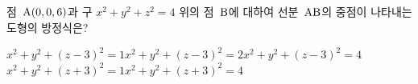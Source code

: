 점~$\mathrm{A}(0{,}\mkern3mu\mathopen{}0{,}\mkern3mu\mathopen{}6)$과 구 $x^2+y^2+z^2=4$ 위의 점~$\mathrm{B}$에 대하여 선분~$\mathrm{AB}$의 중점이 나타내는 도형의 방정식은?
\begin{choicesv}{$x^2+y^2+(z-3)^2=1$}{$x^2+y^2+(z-3)^2=2$}{$x^2+y^2+(z-3)^2=4$}{$x^2+y^2+(z+3)^2=1$}{$x^2+y^2+(z+3)^2=4$}\end{choicesv}
